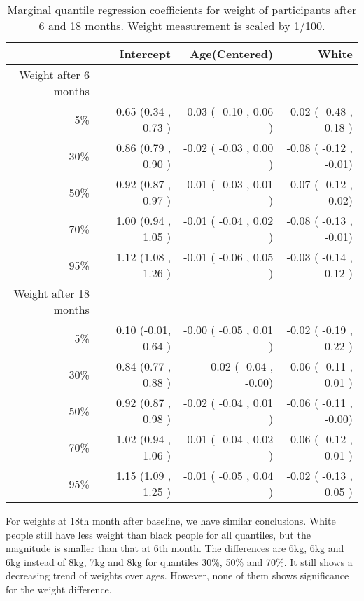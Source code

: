 \documentclass[12pt]{article}
\begin{document}
\begin{table}[ht]
  \renewcommand{\arraystretch}{1.3}
  \begin{center}
    \caption{Marginal quantile regression coefficients for weight of
      participants after 6 and 18 months. Weight measurement is scaled
      by 1/100.}\label{tab:w2}
    \vspace{10pt}
    \begin{tabular}{rrrr}
      \toprule
      & Intercept            & Age(Centered)          & White                  \\
      \hline
      Weight after 6 months                                                         \\
      5\%  & 0.65  (0.34 , 0.73 ) & -0.03 ( -0.10 , 0.06 ) & -0.02 ( -0.48 , 0.18 ) \\
      30\% & 0.86  (0.79 , 0.90 ) & -0.02 ( -0.03 , 0.00 ) & -0.08 ( -0.12 , -0.01) \\
      50\% & 0.92  (0.87 , 0.97 ) & -0.01 ( -0.03 , 0.01 ) & -0.07 ( -0.12 , -0.02) \\
      70\% & 1.00  (0.94 , 1.05 ) & -0.01 ( -0.04 , 0.02 ) & -0.08 ( -0.13 , -0.01) \\
      95\% & 1.12  (1.08 , 1.26 ) & -0.01 ( -0.06 , 0.05 ) & -0.03 ( -0.14 , 0.12 ) \\
      Weight after 18 months                                                        \\
      5\%  & 0.10  (-0.01, 0.64 ) & -0.00 ( -0.05 , 0.01 ) & -0.02 ( -0.19 , 0.22 ) \\
      30\% & 0.84  (0.77 , 0.88 ) & -0.02 ( -0.04 , -0.00) & -0.06 ( -0.11 , 0.01 ) \\
      50\% & 0.92  (0.87 , 0.98 ) & -0.02 ( -0.04 , 0.01 ) & -0.06 ( -0.11 , -0.00) \\
      70\% & 1.02  (0.94 , 1.06 ) & -0.01 ( -0.04 , 0.02 ) & -0.06 ( -0.12 , 0.01 ) \\
      95\% & 1.15  (1.09 , 1.25 ) & -0.01 ( -0.05 , 0.04 ) & -0.02 ( -0.13 , 0.05 ) \\
      \bottomrule
    \end{tabular}
  \end{center}
\end{table}

For weights at 18th month after baseline, we have similar
conclusions. White people still have less weight than black people for
all quantiles, but the magnitude is smaller than that at 6th month.
The differences are 6kg, 6kg and 6kg instead of 8kg, 7kg and 8kg for
quantiles 30\%, 50\% and 70\%. It still shows a decreasing trend of
weights over ages.  However, none of them shows significance for the
weight difference.
\end{document}
